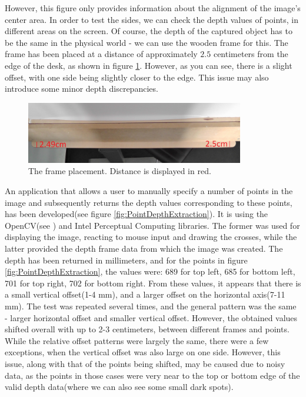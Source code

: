 \documentclass[]{article}
\begin{document}
 However, this figure only provides information about the alignment of the image's center area. In order to test the sides, we can check the depth values of points, in different areas on the screen. Of course, the depth of the captured object has to be the same in the physical world - we can use the wooden frame for this. The frame has been placed at a distance of approximately $2.5$ centimeters from the edge of the desk, as shown in figure \ref{fig:FramePlacement}. However, as you can see, there is a slight offset, with one side being slightly closer to the edge. This issue may also introduce some minor depth discrepancies. 
 
 \begin{figure}[!hbtp]
     \centering
     \includegraphics[width=0.85\textwidth]{figures/FramePlacementCM.jpg}
     \caption{The frame placement. Distance is displayed in red.}
     \label{fig:FramePlacement}
 \end{figure}
 
An application that allows a user to manually specify a number of points in the image and subsequently returns the depth values corresponding to these points, has been developed(see figure \ref{fig:PointDepthExtraction}). It is using the OpenCV(see \cite{opencv}) and Intel Perceptual Computing libraries. The former was used for displaying the image, reacting to mouse input and drawing the crosses, while the latter provided the depth frame data from which the image was created. The depth has been returned in millimeters, and for the points in figure \ref{fig:PointDepthExtraction}, the values were: 689 for top left, 685 for bottom left, 701 for top right, 702 for bottom right. From these values, it appears that there is a small vertical offset(1-4 mm), and a larger offset on the horizontal axis(7-11 mm). The test was repeated several times, and the general pattern was the same - larger horizontal offset and smaller vertical offset. However, the obtained values shifted overall with up to 2-3 centimeters, between different frames and points. While the relative offset patterns were largely the same, there were a few exceptions, when the vertical offset was also large on one side. However, this issue, along with that of the points being shifted, may be caused due to noisy data, as the points in those cases were very near to the top or bottom edge of the valid depth data(where we can also see some small dark spots).
 
\end{document}
